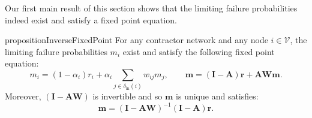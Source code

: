 \documentclass[mnsc,nonblindrev]{informs3}
\newcommand{\inv}{{-1}}
\newcommand{\din}{\delta_{\text{in}}}
\newcommand{\rvec}{\mathbf{r}}
\newcommand{\A}{\mathbf{A}}
\newcommand{\W}{\mathbf{W}}
\newcommand{\I}{\mathbf{I}}
\newcommand{\mean}{m}
\newcommand{\meanvec}{\mathbf{\mean}}
\begin{document}
Our first main result of this section shows that the limiting failure probabilities indeed exist and satisfy a fixed point equation.
\begin{restatable}{proposition}{InverseFixedPoint}
\label{thm:inverse_fixed_point}
For any contractor network and any node $i \in \mathcal{V}$, the limiting failure probabilities $\mean_i$ exist and satisfy the following fixed point equation:
\begin{equation}
    \label{eq:mean_field_fixed_point}
    \mean_i = (1 - \alpha_i) r_i + \alpha_i \sum_{j \in \din(i)} w_{ij} \mean_j, \quad\quad \meanvec = (\I - \A) \rvec + \A \W \meanvec.
\end{equation}
Moreover, $(\I - \A\W)$ is invertible and so $\meanvec$ is unique and satisfies:
\begin{equation}
\label{eq:mean_field_solution}
    \meanvec = (\I - \A\W)^\inv(\I - \A)\rvec.    
\end{equation}
\end{restatable}
\end{document}
